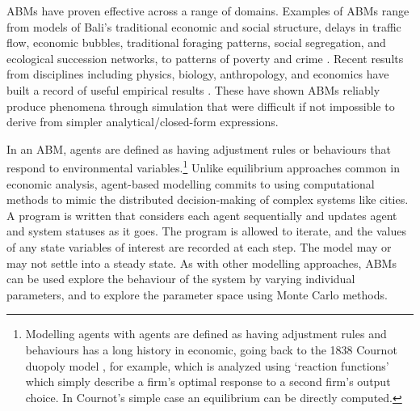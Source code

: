 ABMs have proven effective across a range of domains. Examples of ABMs range from models of Bali's traditional economic and social structure, delays in traffic flow, economic bubbles, 
traditional foraging patterns, %
social segregation, and ecological succession networks, to patterns of poverty and crime \cite{open_agent_based_modeling_consortium_comses_????}. %
Recent results from disciplines including physics, biology, anthropology, and economics have built a record of useful empirical results \cite{parkerMultiAgentSystemsSimulation2003, parker_multi-agent_2003, helbing_social_2011-1}. 
These have shown ABMs reliably produce phenomena through simulation that were difficult if not impossible to derive from simpler analytical/closed-form expressions. 

In an \gls{ABM}, agents are defined as having adjustment rules or behaviours that respond to environmental variables.\footnote{Modelling agents with agents are defined as having adjustment rules and behaviours has a long history in economic, going back to the 1838 Cournot duopoly model \cite{cournotRecherchesPrincipesMathematiques1838}, for example, which is analyzed using `reaction functions' which simply describe a firm's optimal response to a second firm's output choice. In Cournot's simple case an equilibrium can be directly computed.} 
Unlike equilibrium approaches common in economic analysis, agent-based modelling commits to using computational methods to mimic the distributed decision-making of complex systems like cities. A program is written that considers each agent sequentially and updates agent and system statuses as it goes. The program is allowed to iterate, and the values of any state variables of interest are recorded at each step. The model may or may not settle into a steady state. As with other modelling approaches, ABMs can be used explore the behaviour of the system by varying individual parameters, and to explore the parameter space using Monte Carlo methods.

